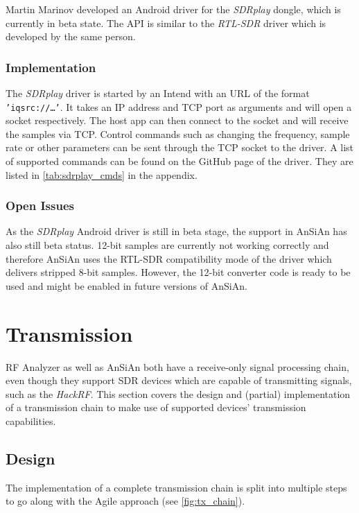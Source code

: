 Martin Marinov developed an Android driver for the \emph{SDRplay} dongle, which
is currently in beta state. The API is similar to the \emph{RTL-SDR} driver which is
developed by the same person.

\subsubsection{Implementation}

The \emph{SDRplay} driver is started by an Intend with an URL of the format
\texttt{'iqsrc://\ldots'}. It takes an IP address and TCP port as arguments and
will open a socket respectively. The host app can then connect to the socket and
will receive the samples via TCP. Control commands such as changing the
frequency, sample rate or other parameters can be sent through the TCP socket
to the driver. A list of supported commands can be found on the GitHub page
of the driver. They are listed in \autoref{tab:sdrplay_cmds} in the appendix.


\subsubsection{Open Issues}

As the \emph{SDRplay} Android driver is still in beta stage, the support in AnSiAn has
also still beta status. 12-bit samples are currently not working correctly and
therefore \ac{AnSiAn} uses the RTL-SDR compatibility mode of the driver which
delivers stripped 8-bit samples. However, the 12-bit converter code is ready to
be used and might be enabled in future versions of \ac{AnSiAn}.


\section{Transmission\label{sec:transmission}}

RF Analyzer as well as \ac{AnSiAn} both have a receive-only signal processing chain, even though they support \ac{SDR} devices which are capable of transmitting signals, such as the \emph{HackRF}. This section covers the design and (partial) implementation of a transmission chain to make use of supported devices' transmission capabilities.


\subsection{Design}

The implementation of a complete transmission chain is split into multiple steps
to go along with the Agile approach (see \autoref{fig:tx_chain}).

